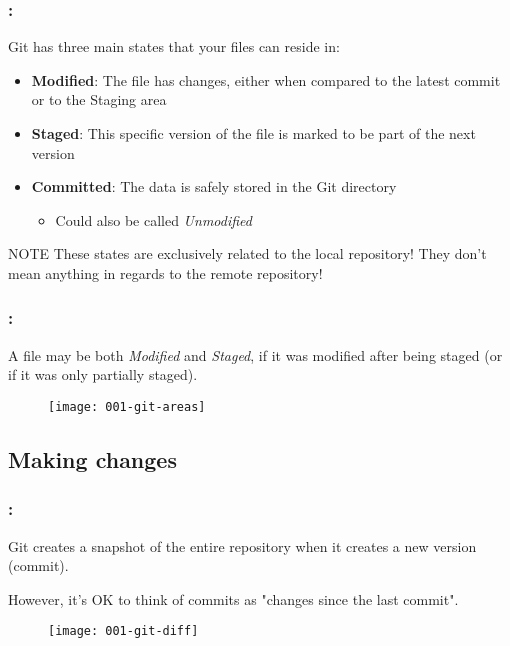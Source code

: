 \begin{frame}
    \frametitle{\secname: \small\subsecname\normalsize}

    Git has three main states that your files can reside in:

    \begin{itemize}
        \item \textbf{Modified}: The file has changes, either when compared to the latest commit or to the Staging area
        \item \textbf{Staged}: This specific version of the file is marked to be part of the next version
        \item \textbf{Committed}: The data is safely stored in the Git directory
        \begin{itemize}
            \item Could also be called \textit{Unmodified}
        \end{itemize}
    \end{itemize}

    \begin{alertblock}{NOTE}
        These states are exclusively related to the local repository! They don't mean anything in regards to the remote repository!
    \end{alertblock}
\end{frame}

\begin{frame}
    \frametitle{\secname: \small\subsecname\normalsize}

    A file may be both \textit{Modified} and \textit{Staged}, if it was modified after being staged (or if it was only partially staged).

    \begin{figure}[h]
        \texttt{[image: 001-git-areas]}
        \centering
    \end{figure}
\end{frame}

\subsection{Making changes}

\begin{frame}
    \frametitle{\secname: \small\subsecname\normalsize}

    Git creates a snapshot of the entire repository when it creates a new version (commit).

    However, it's OK to think of commits as "changes since the last commit".

    \begin{figure}[h]
        \texttt{[image: 001-git-diff]}
        \centering
    \end{figure}
\end{frame}

